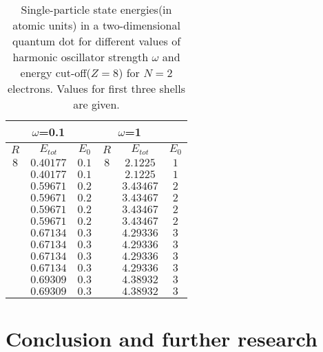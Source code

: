\documentclass[10pt]{article}
\begin{document}
\begin{table}[h!]
  \caption{ Single-particle state energies(in atomic units) in a two-dimensional quantum dot for different values of harmonic oscillator strength $\omega$ and energy cut-off($Z=8$) for $N=2$ electrons. Values for first three shells are given.}
  \label{tab:results1}
  \begin{center}
    \begin{tabular}{ccc|ccc}
     \multirow{2}{*}{} &
      \multicolumn{1}{c}{$\omega$=0.1} &
      \multicolumn{4}{c}{$\omega$=1} \\
    \hline
    \hline
		$R$ & $E_{tot}$ & $E_0$ & $R$ & $E_{tot}$ & $E_0$  \\
    \hline
	   $	8 $  & $0.40177 $ & $  0.1$ &$	8 $  & $2.1225  $ & $  1$  \\
	   $	  $  & $0.40177 $ & $  0.1$ &$	  $  & $2.1225  $ & $  1$  \\
	   $	  $  & $0.59671 $ & $  0.2$ &$	  $  & $3.43467 $ & $  2$  \\
	   $	  $  & $0.59671 $ & $  0.2$ &$	  $  & $3.43467 $ & $  2$  \\
   	   $	  $  & $0.59671 $ & $  0.2$ &$	  $  & $3.43467 $ & $  2$  \\
   	   $	  $  & $0.59671 $ & $  0.2$ &$	  $  & $3.43467 $ & $  2$  \\
       $      $  & $0.67134 $ & $  0.3$ &$    $  & $4.29336 $ & $  3$  \\
       $      $  & $0.67134 $ & $  0.3$ &$    $  & $4.29336 $ & $  3$  \\
       $      $  & $0.67134 $ & $  0.3$ &$    $  & $4.29336 $ & $  3$  \\
       $      $  & $0.67134 $ & $  0.3$ &$    $  & $4.29336 $ & $  3$  \\
				 & $0.69309 $ & $  0.3$ &        & $4.38932 $ & $  3$  \\
				 & $0.69309 $ & $  0.3$ &        & $4.38932 $ & $  3$  \\
	\end{tabular}                                                                                  
  \end{center}
\end{table}


\section{Conclusion and further research}\label{conc}
\end{document}
